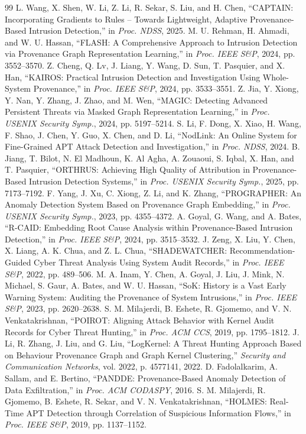 \documentclass[conference]{IEEEtran}
\begin{document}
\begin{thebibliography}{99}
 L. Wang, X. Shen, W. Li, Z. Li, R. Sekar, S. Liu, and H. Chen, ``CAPTAIN: Incorporating Gradients to Rules -- Towards Lightweight, Adaptive Provenance-Based Intrusion Detection,'' in \emph{Proc. NDSS}, 2025.
 M. U. Rehman, H. Ahmadi, and W. U. Hassan, ``FLASH: A Comprehensive Approach to Intrusion Detection via Provenance Graph Representation Learning,'' in \emph{Proc. IEEE S\&P}, 2024, pp. 3552--3570.
 Z. Cheng, Q. Lv, J. Liang, Y. Wang, D. Sun, T. Pasquier, and X. Han, ``KAIROS: Practical Intrusion Detection and Investigation Using Whole-System Provenance,'' in \emph{Proc. IEEE S\&P}, 2024, pp. 3533--3551.
 Z. Jia, Y. Xiong, Y. Nan, Y. Zhang, J. Zhao, and M. Wen, ``MAGIC: Detecting Advanced Persistent Threats via Masked Graph Representation Learning,'' in \emph{Proc. USENIX Security Symp.}, 2024, pp. 5197--5214.
 S. Li, F. Dong, X. Xiao, H. Wang, F. Shao, J. Chen, Y. Guo, X. Chen, and D. Li, ``NodLink: An Online System for Fine-Grained APT Attack Detection and Investigation,'' in \emph{Proc. NDSS}, 2024.
 B. Jiang, T. Bilot, N. El Madhoun, K. Al Agha, A. Zouaoui, S. Iqbal, X. Han, and T. Pasquier, ``ORTHRUS: Achieving High Quality of Attribution in Provenance-Based Intrusion Detection Systems,'' in \emph{Proc. USENIX Security Symp.}, 2025, pp. 7173--7192.
 F. Yang, J. Xu, C. Xiong, Z. Li, and K. Zhang, ``PROGRAPHER: An Anomaly Detection System Based on Provenance Graph Embedding,'' in \emph{Proc. USENIX Security Symp.}, 2023, pp. 4355--4372.
 A. Goyal, G. Wang, and A. Bates, ``R-CAID: Embedding Root Cause Analysis within Provenance-Based Intrusion Detection,'' in \emph{Proc. IEEE S\&P}, 2024, pp. 3515--3532.
 J. Zeng, X. Liu, Y. Chen, X. Liang, A. K. Chua, and Z. L. Chua, ``SHADEWATCHER: Recommendation-Guided Cyber Threat Analysis Using System Audit Records,'' in \emph{Proc. IEEE S\&P}, 2022, pp. 489--506.
 M. A. Inam, Y. Chen, A. Goyal, J. Liu, J. Mink, N. Michael, S. Gaur, A. Bates, and W. U. Hassan, ``SoK: History is a Vast Early Warning System: Auditing the Provenance of System Intrusions,'' in \emph{Proc. IEEE S\&P}, 2023, pp. 2620--2638.
 S. M. Milajerdi, B. Eshete, R. Gjomemo, and V. N. Venkatakrishnan, ``POIROT: Aligning Attack Behavior with Kernel Audit Records for Cyber Threat Hunting,'' in \emph{Proc. ACM CCS}, 2019, pp. 1795--1812.
 J. Li, R. Zhang, J. Liu, and G. Liu, ``LogKernel: A Threat Hunting Approach Based on Behaviour Provenance Graph and Graph Kernel Clustering,'' \emph{Security and Communication Networks}, vol. 2022, p. 4577141, 2022.
 D. Fadolalkarim, A. Sallam, and E. Bertino, ``PANDDE: Provenance-Based Anomaly Detection of Data Exfiltration,'' in \emph{Proc. ACM CODASPY}, 2016.
 S. M. Milajerdi, R. Gjomemo, B. Eshete, R. Sekar, and V. N. Venkatakrishnan, ``HOLMES: Real-Time APT Detection through Correlation of Suspicious Information Flows,'' in \emph{Proc. IEEE S\&P}, 2019, pp. 1137--1152.


\end{thebibliography}
\end{document}

